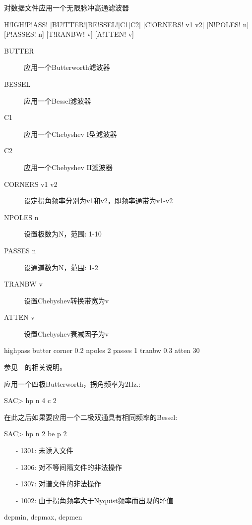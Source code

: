 \label{cmd:highpass}

对数据文件应用一个无限脉冲高通滤波器

\begin{SACSTX}
H!IGH!P!ASS! [BU!TTER!|BE!SSEL!|C1|C2] [C!ORNERS! v1 v2] [N!POLES! n] [P!ASSES! n]
    [T!RANBW! v] [A!TTEN! v]
\end{SACSTX}

\begin{description}
\item [BUTTER] 应用一个Butterworth滤波器
\item [BESSEL] 应用一个Bessel滤波器
\item [C1] 应用一个Chebyshev I型滤波器
\item [C2] 应用一个Chebyshev II滤波器
\item [CORNERS v1 v2] 设定拐角频率分别为v1和v2，即频率通带为v1-v2
\item [NPOLES n] 设置极数为N，范围: 1-10
\item [PASSES n] 设通道数为N，范围: 1-2
\item [TRANBW v] 设置Chebyshev转换带宽为v
\item [ATTEN v] 设置Chebyshev衰减因子为v
\end{description}

\begin{SACDFT}
highpass butter corner 0.2 npoles 2 passes 1 tranbw 0.3 atten 30
\end{SACDFT}

参见~~的相关说明。

应用一个四极Butterworth，拐角频率为2Hz.:
\begin{SACCode}
SAC> hp n 4 c 2
\end{SACCode}

在此之后如果要应用一个二极双通具有相同频率的Bessel:
\begin{SACCode}
SAC> hp n 2 be p 2
\end{SACCode}

\begin{itemize}
\item[-]1301: 未读入文件
\item[-]1306: 对不等间隔文件的非法操作
\item[-]1307: 对谱文件的非法操作
\item[-]1002: 由于拐角频率大于Nyquist频率而出现的坏值
\end{itemize}

depmin, depmax, depmen

